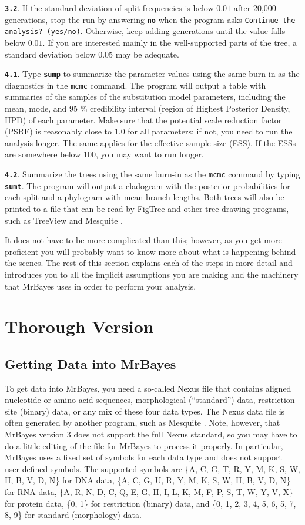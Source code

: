 \documentclass[12pt]{book}
\newcommand{\ttt}[1]{\texttt{#1}}
\newcommand{\tb}[1]{\ttt{\textbf{#1}}}
\begin{document}
\tb{3.2}. If the standard deviation of split frequencies is below $0.01$ after 20,000 generations,
stop the run by answering \tb{no} when the program asks \ttt{Continue the analysis? (yes/no)}.
Otherwise, keep adding generations until the value falls below $0.01$. If you are interested mainly
in the well-supported parts of the tree, a standard deviation below $0.05$ may be adequate.

\tb{4.1}. Type \tb{sump} to summarize the parameter values using the same burn-in as the
diagnostics in the \ttt{mcmc} command. The program will output a table with summaries of the
samples of the substitution model parameters, including the mean, mode, and 95 \% credibility
interval (region of Highest Posterior Density, HPD) of each parameter. Make sure that the potential
scale reduction factor (PSRF) is reasonably close to $1.0$ for all parameters; if not, you need to
run the analysis longer. The same applies for the effective sample size (ESS). If the ESSs are
somewhere below 100, you may want to run longer.

\tb{4.2}. Summarize the trees using the same burn-in as the \ttt{mcmc} command by typing \tb{sumt}.
The program will output a cladogram with the posterior probabilities for each split and a phylogram
with mean branch lengths. Both trees will also be printed to a file that can be read by FigTree
\citep{rambaut12} and other tree-drawing programs, such as TreeView \citep{page96} and Mesquite
\citep{maddison06}.

It does not have to be more complicated than this; however, as you get more proficient you will
probably want to know more about what is happening behind the scenes. The rest of this section
explains each of the steps in more detail and introduces you to all the implicit assumptions you
are making and the machinery that MrBayes uses in order to perform your analysis.

\section{Thorough Version}

\subsection{Getting Data into MrBayes}
To get data into MrBayes, you need a so-called Nexus file that contains aligned nucleotide or amino
acid sequences, morphological (``standard'') data, restriction site (binary) data, or any mix of
these four data types. The Nexus data file is often generated by another program, such as Mesquite
\citep{maddison06}. Note, however, that MrBayes version 3 does not support the full Nexus standard,
so you may have to do a little editing of the file for MrBayes to process it properly. In
particular, MrBayes uses a fixed set of symbols for each data type and does not support
user-defined symbols. The supported symbols are \{A, C, G, T, R, Y, M, K, S, W, H, B, V, D, N\} for
DNA data, \{A, C, G, U, R, Y, M, K, S, W, H, B, V, D, N\} for RNA data, \{A, R, N, D, C, Q, E, G,
H, I, L, K, M, F, P, S, T, W, Y, V, X\} for protein data, \{0, 1\} for restriction (binary) data,
and \{0, 1, 2, 3, 4, 5, 6, 5, 7, 8, 9\} for standard (morphology) data.
\end{document}
